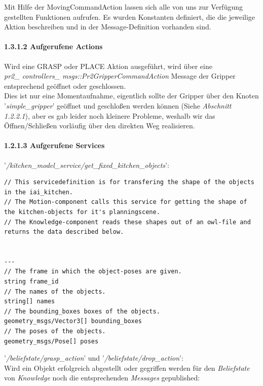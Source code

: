 \documentclass{suturo}
\begin{document}
Mit Hilfe der MovingCommandAction lassen sich alle von uns zur Verfügung gestellten Funktionen aufrufen. Es wurden Konstanten definiert, die die jeweilige Aktion beschreiben und in der Message-Definition vorhanden sind.

\paragraph{1.3.1.2 Aufgerufene Actions}
Wird eine GRASP oder PLACE Aktion ausgeführt, wird über eine \\
\textit{pr2\_ controllers\_ msgs::Pr2GripperCommandAction} Message der Gripper entsprechend geöffnet oder geschlossen.\\
Dies ist nur eine Momentaufnahme, eigentlich sollte der Gripper über den Knoten '\textit{simple\_gripper}' geöffnet und geschloßen werden können (Siehe \textit{Abschnitt 1.2.2.1}),
aber es gab leider noch kleinere Probleme, weshalb wir das Öffnen/Schließen vorläufig über den direkten Weg realisieren.\\


\paragraph{1.2.1.3 Aufgerufene Services}
'\textit{/kitchen\_model\_service/get\_fixed\_kitchen\_objects}': 
\begin{lstlisting}[caption={Definition des GetFixedKitchenObjects-Service},captionpos=b]
// This servicedefinition is for transfering the shape of the objects in the iai_kitchen.
// The Motion-component calls this service for getting the shape of the kitchen-objects for it's planningscene.
// The Knowledge-component reads these shapes out of an owl-file and returns the data described below.


---
// The frame in which the object-poses are given.
string frame_id
// The names of the objects.
string[] names
// The bounding_boxes boxes of the objects.
geometry_msgs/Vector3[] bounding_boxes
// The poses of the objects.
geometry_msgs/Pose[] poses
\end{lstlisting}

'\textit{/beliefstate/grasp\_action}' und '\textit{/beliefstate/drop\_action}':\\
Wird ein Objekt erfolgreich abgestellt oder gegriffen werden für den \textit{Beliefstate} von \textit{Knowledge} noch die entsprechenden \textit{Messages} gepublished: \\
\end{document}
